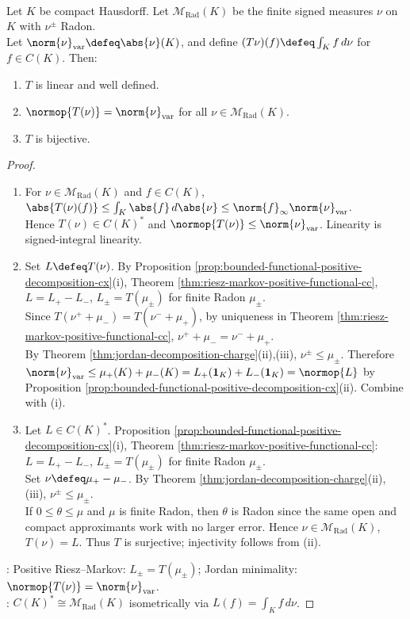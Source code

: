 \begin{theorem} \label{thm:riesz-representation-compact-hausdorff-cx-dual} \\
Let $K$ be compact Hausdorff. Let $\mathcal{M}_{\mathrm{Rad}}(K)$ be the finite signed measures $\nu$ on $K$ with $\nu^\pm$ Radon.\\
Let $\norm{\nu}_{\mathrm{var}}\defeq\abs{\nu}(K)$, and define $(T\nu)(f)\defeq\int_K f\,d\nu$ for $f\in C(K)$. Then:
\begin{enumerate}[label=(\roman*)]
    \setlength{\itemsep}{0pt}
\item $T$ is linear and well defined.
\item $\normop{T(\nu)}=\norm{\nu}_{\mathrm{var}}$ for all $\nu\in\mathcal{M}_{\mathrm{Rad}}(K)$.
\item $T$ is bijective.
\end{enumerate}
\begin{proof}
\begin{enumerate}[label=(\roman*)]
\setlength{\itemsep}{0pt}
\item For $\nu\in\mathcal{M}_{\mathrm{Rad}}(K)$ and $f\in C(K)$, $\abs{T(\nu)(f)}\leq\int_K\abs{f}\,d\abs{\nu}\leq\norm{f}_\infty\norm{\nu}_{\mathrm{var}}$.\\
Hence $T(\nu)\in C(K)^*$ and $\normop{T(\nu)}\leq\norm{\nu}_{\mathrm{var}}$. Linearity is signed-integral linearity.
\item Set $L\defeq T(\nu)$. By Proposition \ref{prop:bounded-functional-positive-decomposition-cx}(i), Theorem \ref{thm:riesz-markov-positive-functional-cc}, $L=L_+-L_-$, $L_\pm=T(\mu_\pm)$ for finite Radon $\mu_\pm$.\\
Since $T(\nu^++\mu_-)=T(\nu^-+\mu_+)$, by uniqueness in Theorem \ref{thm:riesz-markov-positive-functional-cc}, $\nu^++\mu_-=\nu^-+\mu_+$.\\
By Theorem \ref{thm:jordan-decomposition-charge}(ii),(iii), $\nu^\pm\leq\mu_\pm$. Therefore $\norm{\nu}_{\mathrm{var}}\leq\mu_+(K)+\mu_-(K)=L_+(\mathbf{1}_K)+L_-(\mathbf{1}_K)=\normop{L}$ by Proposition \ref{prop:bounded-functional-positive-decomposition-cx}(ii). Combine with (i).
 \item Let $L\in C(K)^*$. Proposition \ref{prop:bounded-functional-positive-decomposition-cx}(i), Theorem \ref{thm:riesz-markov-positive-functional-cc}: $L=L_+-L_-$, $L_\pm=T(\mu_\pm)$ for finite Radon $\mu_\pm$.\\
 Set $\nu\defeq\mu_+-\mu_-$. By Theorem \ref{thm:jordan-decomposition-charge}(ii),(iii), $\nu^\pm\leq\mu_\pm$.\\
 If $0\leq\theta\leq\mu$ and $\mu$ is finite Radon, then $\theta$ is Radon since the same open and compact approximants work with no larger error. Hence $\nu\in\mathcal{M}_{\mathrm{Rad}}(K)$, $T(\nu)=L$. Thus $T$ is surjective; injectivity follows from (ii).
\end{enumerate}
: Positive Riesz--Markov: $L_\pm=T(\mu_\pm)$; Jordan minimality: $\normop{T(\nu)}=\norm{\nu}_{\mathrm{var}}$.\\
: $C(K)^*\cong\mathcal{M}_{\mathrm{Rad}}(K)$ isometrically via $L(f)=\int_K f\,d\nu$.
\end{proof}
\end{theorem}

